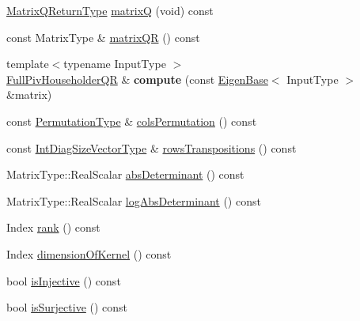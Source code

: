 \begin{DoxyCompactItemize}
\item 
\mbox{\hyperlink{struct_eigen_1_1internal_1_1_full_piv_householder_q_r_matrix_q_return_type}{Matrix\+Q\+Return\+Type}} \mbox{\hyperlink{class_eigen_1_1_full_piv_householder_q_r_ad26dd2d3c002939771d2375e4e051c28}{matrixQ}} (void) const
\item 
const Matrix\+Type \& \mbox{\hyperlink{class_eigen_1_1_full_piv_householder_q_r_a9c16411e5d8f1fc634a5797018d5aa3e}{matrix\+QR}} () const
\item 
\mbox{\label{class_eigen_1_1_full_piv_householder_q_r_aadf0f38d53a132dd246abe527175d058}} 
{\footnotesize template$<$typename Input\+Type $>$ }\\\mbox{\hyperlink{class_eigen_1_1_full_piv_householder_q_r}{Full\+Piv\+Householder\+QR}} \& {\bfseries compute} (const \mbox{\hyperlink{struct_eigen_1_1_eigen_base}{Eigen\+Base}}$<$ Input\+Type $>$ \&matrix)
\item 
const \mbox{\hyperlink{class_eigen_1_1_permutation_matrix}{Permutation\+Type}} \& \mbox{\hyperlink{class_eigen_1_1_full_piv_householder_q_r_abeda6d91e196c13d4dd8b7542fef3e17}{cols\+Permutation}} () const
\item 
const \mbox{\hyperlink{class_eigen_1_1_matrix}{Int\+Diag\+Size\+Vector\+Type}} \& \mbox{\hyperlink{class_eigen_1_1_full_piv_householder_q_r_abebbfc0ca6e3dd285a0ad0c907abb093}{rows\+Transpositions}} () const
\item 
Matrix\+Type\+::\+Real\+Scalar \mbox{\hyperlink{class_eigen_1_1_full_piv_householder_q_r_a1029e1ccc70bb8669043c5775e7f3b75}{abs\+Determinant}} () const
\item 
Matrix\+Type\+::\+Real\+Scalar \mbox{\hyperlink{class_eigen_1_1_full_piv_householder_q_r_aafde38918912c9b562f44b0fc3b22589}{log\+Abs\+Determinant}} () const
\item 
Index \mbox{\hyperlink{class_eigen_1_1_full_piv_householder_q_r_aeae555220f46477818ccc94aca2de770}{rank}} () const
\item 
Index \mbox{\hyperlink{class_eigen_1_1_full_piv_householder_q_r_a3b5fe5edc66acc01c45b16e728470aa0}{dimension\+Of\+Kernel}} () const
\item 
bool \mbox{\hyperlink{class_eigen_1_1_full_piv_householder_q_r_a6776788011026b0f63192485a59deaed}{is\+Injective}} () const
\item 
bool \mbox{\hyperlink{class_eigen_1_1_full_piv_householder_q_r_aa3593db4708ce9079b0bdf219b99f57e}{is\+Surjective}} () const
\item 

\end{DoxyCompactItemize}
